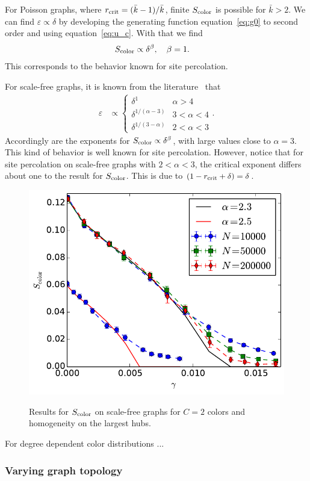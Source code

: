 \documentclass[aps, pre, onecolumn, a4paper, floatfix]{revtex4}
\begin{document}
For Poisson graphs, where $r_{\rm crit}=(\bar{k}-1)/\bar{k}$, 
finite $S_{\rm color}$ is possible for $\bar{k}>2$. 
We can find $\varepsilon\propto \delta$ by developing the generating function equation~\ref{eq:g0} 
to second order and using equation~\ref{eq:u_c}. With that we find 
\begin{align}
S_{\rm color} &\propto \delta^\beta,\quad \beta=1. 
\end{align}
This corresponds to the behavior known for site percolation. 

For scale-free graphs, it is known from the literature~\cite{cohen-2002percolation} that 
\begin{align}
\varepsilon &\propto 
\begin{cases}
\delta^1 & \alpha>4\\
\delta^{1/(\alpha-3)} & 3<\alpha<4\\
\delta^{1/(3-\alpha)} & 2<\alpha<3
\end{cases}.
\end{align}
Accordingly are the exponents for $S_{\rm color}\propto \delta^{\beta}$, with large values close to $\alpha=3$.
This kind of behavior is well known for site percolation. 
However, notice that for site percolation on scale-free graphs with $2<\alpha<3$, 
the critical exponent differs about one to the result for $S_{\rm color}$.
This is due to $(1-r_{\rm crit}+\delta)=\delta$. 

\begin{figure}[htb]
    \includegraphics[width=0.45\columnwidth]{S_color_degree_dependent_broad.pdf}\\
    \caption{Results for $S_{\rm color}$ on scale-free graphs for $C=2$ colors 
    and homogeneity on the largest hubs.}
    \label{fig:decomposition}
\end{figure}
%
For degree dependent color distributions ...



\subsubsection{Varying graph topology}
\end{document}
